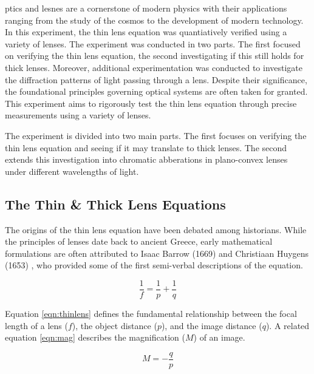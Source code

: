 \documentclass[aip, cp, amsmath, amssymb, reprint, nofootinbib]{revtex4-2}
\begin{document}
        ptics and lesnes are a cornerstone of modern physics with their applications ranging from the study of the cosmos to the development of modern technology. In this experiment, the thin lens equation was quantiatively verified using a variety of lenses. The experiment was conducted in two parts. The first focused on verifying the thin lens equation, the second investigating if this still holds for thick lenses. Moreover, additional experimentation was conducted to investigate the diffraction patterns of light passing through a lens. Despite their significance, the foundational principles governing optical systems are often taken for granted. This experiment aims to rigorously test the thin lens equation through precise measurements using a variety of lenses.
        
        The experiment is divided into two main parts. The first focuses on verifying the thin lens equation and seeing if it may translate to thick lenses. The second extends this investigation into chromatic abberations in plano-convex lenses under different wavelengths of light.

        \subsection{The Thin \& Thick Lens Equations}
        
        The origins of the thin lens equation have been debated among historians. While the principles of lenses date back to ancient Greece, early mathematical formulations are often attributed to Isaac Barrow (1669) and Christiaan Huygens (1653) \cite{historyoptics}, who provided some of the first semi-verbal descriptions of the equation.
        
        \begin{equation} \label{eqn:thinlens}
            \frac{1}{f} = \frac{1}{p} + \frac{1}{q}
        \end{equation}
        
        Equation \eqref{eqn:thinlens} \cite{pwoptics} defines the fundamental relationship between the focal length of a lens ($f$), the object distance ($p$), and the image distance ($q$). A related equation \eqref{eqn:mag}\cite{pwoptics} describes the magnification ($M$) of an image.
        
        \begin{equation} \label{eqn:mag}
            M = -\frac{q}{p}
        \end{equation}
        
\end{document}

